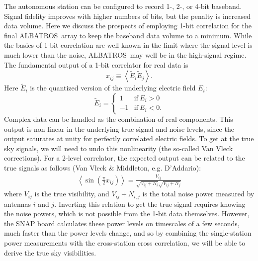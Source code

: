 \documentclass{ws-jai}
\def\albatros{ALBATROS}
\begin{document}
The autonomous station can be configured to record 1-, 2-, or 4-bit
baseband.  Signal fidelity improves with higher numbers of bits, but
the penalty is increased data volume.  Here we discuss the prospects
of employing 1-bit correlation for the final \albatros\ array to keep
the baseband data volume to a minimum.  While the basics of 1-bit
correlation are well known in the limit where the signal level is much
lower than the noise, \albatros\ may well be in the high-signal
regime.  The fundamental output of a 1-bit correlator for real data is
\begin{equation}
  x_{ij} \equiv \left < \tilde{E}_i \tilde{E}_j \right >.
\end{equation}
Here $\tilde{E}_i$ is the quantized version of the underlying electric
field $E_i$:
\begin{equation}
  \tilde{E}_i=
  \begin{cases}
    1 & \text{if}\ E_i > 0 \\
    -1 & \text{if}\ E_i < 0.
  \end{cases}
\end{equation}
Complex data can be handled as the combination of real components.
This output is non-linear in the underlying true signal and noise
levels, since the output saturates at unity for perfectly correlated
electric fields.  To get at the true sky signals, we will need to undo
this nonlinearity (the so-called Van Vleck corrections).  For a
2-level correlator, the expected output can be related to the true
signals as follows (Van Vleck \& Middleton, e.g. D'Addario):
\begin{eqnarray}
\label{eqn:1bit_output}
\left < \sin(\frac{\pi}{2}x_{ij})\right > = \frac{V_{ij}}{\sqrt{V_{ij}+N_i}\sqrt{V_{ij}+N_j}}
\end{eqnarray}
where $V_{ij}$ is the true visibility, and $V_{ij}+N_{i,j}$ is the total noise power measured by antennas $i$ and $j$.  Inverting this relation to get the true signal requires knowing the noise powers, which is not possible from the 1-bit data themselves.  However, the SNAP board calculates these power levels on timescales of a few seconds, much faster than the power levels change, and so by combining the single-station power measurements with the cross-station cross correlation, we will be able to derive the true sky visibilities.  
\end{document}
